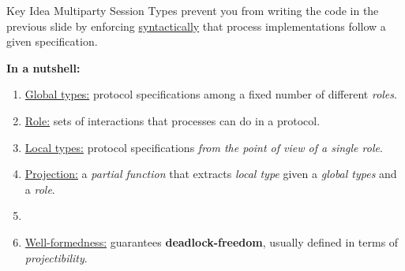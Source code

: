 \begin{frame}[fragile]{Key Idea}
  Multiparty Session Types prevent you from writing the code in the previous
  slide by enforcing \underline{syntactically} that process implementations
  follow a given specification.

  \vspace{1cm}
  \textbf{In a nutshell:}
  \begin{enumerate}
    \item \underline{Global types:} protocol specifications among a fixed number of different \emph{roles}.
    \item \underline{Role:} sets of interactions that processes can do in a protocol.
    \item \underline{Local types:} protocol specifications \emph{from the point of view of a single role}.
    \item \underline{Projection:} a \emph{partial function} that extracts
      \emph{local type} given a \emph{global types} and a \emph{role}.
    \item[]
    \item \underline{Well-formedness:} guarantees \textbf{deadlock-freedom},
      usually defined in terms of \emph{projectibility}.
  \end{enumerate}
\end{frame}

